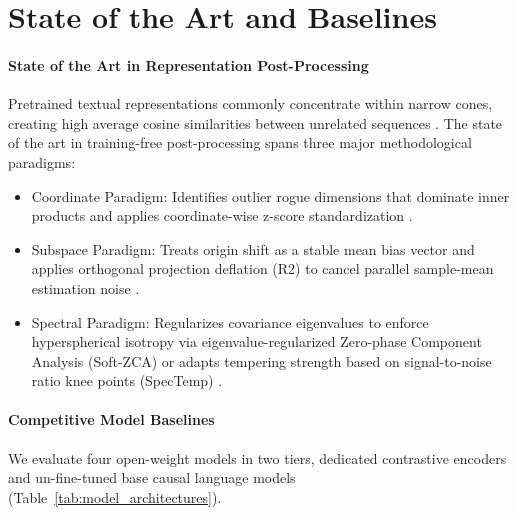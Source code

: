 \section{State of the Art and Baselines}
\label{sec:baselines_sota}

\paragraph{State of the Art in Representation Post-Processing}
Pretrained textual representations commonly concentrate within narrow cones, creating high average cosine similarities between unrelated sequences \citep{ethayarajh-2019-contextual}. The state of the art in training-free post-processing spans three major methodological paradigms:
\begin{itemize}
\item Coordinate Paradigm: Identifies outlier rogue dimensions that dominate inner products and applies coordinate-wise z-score standardization \citep{timkey2021all}.
\item Subspace Paradigm: Treats origin shift as a stable mean bias vector and applies orthogonal projection deflation (R2) to cancel parallel sample-mean estimation noise \citep{ren2025correcting}.
\item Spectral Paradigm: Regularizes covariance eigenvalues to enforce hyperspherical isotropy via eigenvalue-regularized Zero-phase Component Analysis (Soft-ZCA) \citep{diera2024isotropy} or adapts tempering strength based on signal-to-noise ratio knee points (SpecTemp) \citep{li2026spectral}.
\end{itemize}

\paragraph{Competitive Model Baselines}
We evaluate four open-weight models in two tiers, dedicated contrastive encoders and un-fine-tuned base causal language models (Table~\ref{tab:model_architectures}).

